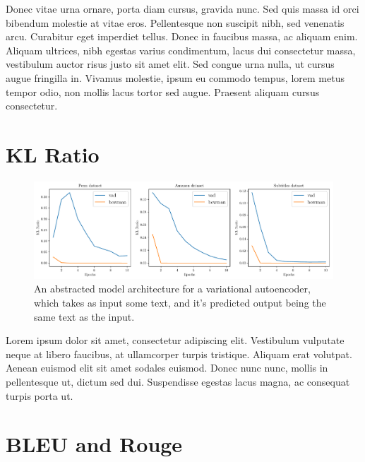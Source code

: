 \documentclass[12pt,twoside]{report}
\begin{document}
Donec vitae urna ornare, porta diam cursus, gravida nunc. Sed quis massa id orci bibendum molestie at vitae eros. Pellentesque non suscipit nibh, sed venenatis arcu. Curabitur eget imperdiet tellus. Donec in faucibus massa, ac aliquam enim. Aliquam ultrices, nibh egestas varius condimentum, lacus dui consectetur massa, vestibulum auctor risus justo sit amet elit. Sed congue urna nulla, ut cursus augue fringilla in. Vivamus molestie, ipsum eu commodo tempus, lorem metus tempor odio, non mollis lacus tortor sed augue. Praesent aliquam cursus consectetur.

\section{KL Ratio}

\begin{figure}[!ht]
	\centering
	\includegraphics[width=150mm]{results/kl_ratio.pdf}
	\caption{An abstracted model architecture for a variational autoencoder, which takes as input some text, and it's predicted output being the same text as the input.\label{r:kl_ratio}}
  \end{figure}


Lorem ipsum dolor sit amet, consectetur adipiscing elit. Vestibulum vulputate neque at libero faucibus, at ullamcorper turpis tristique. Aliquam erat volutpat. Aenean euismod elit sit amet sodales euismod. Donec nunc nunc, mollis in pellentesque ut, dictum sed dui. Suspendisse egestas lacus magna, ac consequat turpis porta ut. 


\section{BLEU and Rouge}
\end{document}
